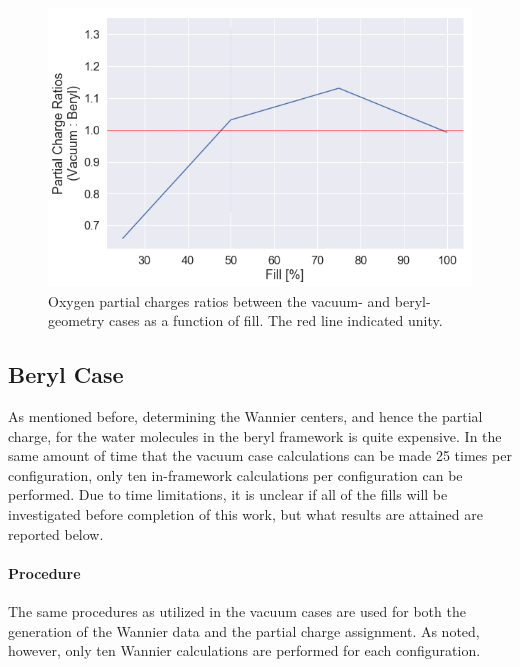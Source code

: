         \begin{figure}
            \centering
            \includegraphics[width=0.9\linewidth]{Figures/System/pc_vacuum_pc_ratios.png}
            \caption{Oxygen partial charges ratios between the vacuum- and beryl-geometry cases as a function of fill. The red line indicated unity.}
            \label{fig:pc_vacuum_pc_ratios}
        \end{figure}
        
        
        \subsection{Beryl Case}
        \label{sec:pc_beryl_case}
        
        As mentioned before, determining the Wannier centers, and hence the partial charge, for the water molecules in the beryl framework is quite expensive. In the same amount of time that the vacuum case calculations can be made 25 times per configuration, only ten in-framework calculations per configuration can be performed. Due to time limitations, it is unclear if all of the fills will be investigated before completion of this work, but what results are attained are reported below.
        
        \paragraph{Procedure} The same procedures as utilized in the vacuum cases are used for both the generation of the Wannier data and the partial charge assignment. As noted, however, only ten Wannier calculations are performed for each configuration.
        
